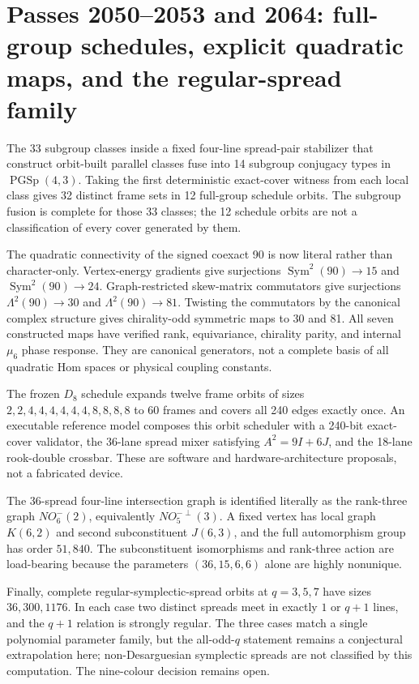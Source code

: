 \section*{Passes 2050--2053 and 2064: full-group schedules, explicit quadratic maps, and the regular-spread family}
The 33 subgroup classes inside a fixed four-line spread-pair stabilizer that
construct orbit-built parallel classes fuse into 14 subgroup conjugacy types in
$\operatorname{PGSp}(4,3)$.  Taking the first deterministic exact-cover witness
from each local class gives 32 distinct frame sets in 12 full-group schedule
orbits.  The subgroup fusion is complete for those 33 classes; the 12 schedule
orbits are not a classification of every cover generated by them.

The quadratic connectivity of the signed coexact 90 is now literal rather than
character-only.  Vertex-energy gradients give surjections
$\operatorname{Sym}^2(90)\to15$ and $\operatorname{Sym}^2(90)\to24$.
Graph-restricted skew-matrix commutators give surjections
$\Lambda^2(90)\to30$ and $\Lambda^2(90)\to81$.  Twisting the commutators by the
canonical complex structure gives chirality-odd symmetric maps to 30 and 81.
All seven constructed maps have verified rank, equivariance, chirality parity,
and internal $\mu_6$ phase response.  They are canonical generators, not a
complete basis of all quadratic Hom spaces or physical coupling constants.

The frozen $D_8$ schedule expands twelve frame orbits of sizes
$2,2,4,4,4,4,4,4,8,8,8,8$ to 60 frames and covers all 240 edges exactly once.
An executable reference model composes this orbit scheduler with a 240-bit
exact-cover validator, the 36-lane spread mixer satisfying
$A^2=9I+6J$, and the 18-lane rook-double crossbar.  These are software and
hardware-architecture proposals, not a fabricated device.

The 36-spread four-line intersection graph is identified literally as the
rank-three graph $NO_6^-(2)$, equivalently $NO_5^{-\perp}(3)$.  A fixed vertex
has local graph $K(6,2)$ and second subconstituent $J(6,3)$, and the full
automorphism group has order $51{,}840$.  The subconstituent isomorphisms and
rank-three action are load-bearing because the parameters $(36,15,6,6)$ alone
are highly nonunique.

Finally, complete regular-symplectic-spread orbits at $q=3,5,7$ have sizes
$36,300,1176$.  In each case two distinct spreads meet in exactly $1$ or $q+1$
lines, and the $q+1$ relation is strongly regular.  The three cases match a
single polynomial parameter family, but the all-odd-$q$ statement remains a
conjectural extrapolation here; non-Desarguesian symplectic spreads are not
classified by this computation.  The nine-colour decision remains open.
